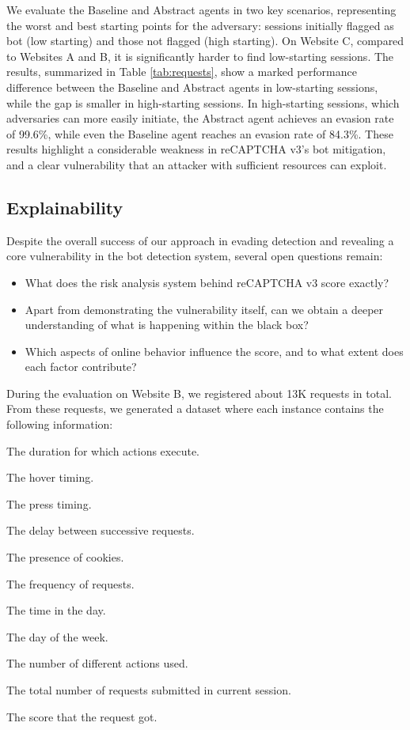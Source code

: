 We evaluate the Baseline and Abstract agents in two key scenarios, representing the worst and best starting points for the adversary: sessions initially flagged as bot (low starting) and those not flagged (high starting).
On Website C, compared to Websites A and B, it is significantly harder to find low-starting sessions.
The results, summarized in Table \ref{tab:requests},
show a marked performance difference between the Baseline and Abstract agents in low-starting sessions, while the gap is smaller in high-starting sessions.
In high-starting sessions, which adversaries can more easily initiate, the Abstract agent achieves an evasion rate of 99.6\%, while even the Baseline agent reaches an evasion rate of 84.3\%.
These results highlight a considerable weakness in reCAPTCHA v3's bot mitigation, and a clear vulnerability that an attacker with sufficient resources can exploit.

\subsection{Explainability}

Despite the overall success of our approach in evading detection and revealing a core vulnerability in the bot detection system, several open questions remain:
\begin{itemize}
    \item What does the risk analysis system behind reCAPTCHA v3 score exactly?
    \item Apart from demonstrating the vulnerability itself, can we obtain a deeper understanding of what is happening within the black box?
    \item Which aspects of online behavior influence the score, and to what extent does each factor contribute?
\end{itemize}

During the evaluation on Website B, we registered about 13K requests in total.
From these requests, we generated a dataset where each instance contains the following information:
\begin{enumerate*}
    \item The duration for which actions execute.
    \item The hover timing.
    \item The press timing.
    \item The delay between successive requests.
    \item The presence of cookies.
    \item The frequency of requests.
    \item The time in the day.
    \item The day of the week.
    \item The number of different actions used.
    \item The total number of requests submitted in current session.
    \item The score that the request got.
\end{enumerate*}

